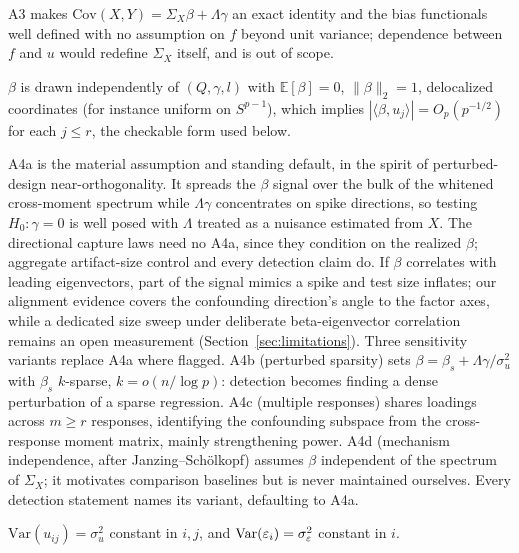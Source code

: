 A3 makes $\mathrm{Cov}(X,Y) = \Sigma_X\beta + \Lambda\gamma$ an exact identity and the bias functionals well defined with no assumption on $f$ beyond unit variance; dependence between $f$ and $u$ would redefine $\Sigma_X$ itself, and is out of scope.

\begin{assumption}
\label{assump:A4a}
$\beta$ is drawn independently of $(Q, \gamma, l)$ with $\mathbb{E}[\beta] = 0$, $\|\beta\|_2 = 1$, delocalized coordinates (for instance uniform on $S^{p-1}$), which implies $|\langle \beta, u_j \rangle| = O_p(p^{-1/2})$ for each $j \le r$, the checkable form used below.
\end{assumption}

A4a is the material assumption and standing default, in the spirit of perturbed-design near-orthogonality. It spreads the $\beta$ signal over the bulk of the whitened cross-moment spectrum while $\Lambda\gamma$ concentrates on spike directions, so testing $H_0\colon \gamma = 0$ is well posed with $\Lambda$ treated as a nuisance estimated from $X$. The directional capture laws need no A4a, since they condition on the realized $\beta$; aggregate artifact-size control and every detection claim do. If $\beta$ correlates with leading eigenvectors, part of the signal mimics a spike and test size inflates; our alignment evidence covers the confounding direction's angle to the factor axes, while a dedicated size sweep under deliberate beta-eigenvector correlation remains an open measurement (Section~\ref{sec:limitations}). Three sensitivity variants replace A4a where flagged. A4b (perturbed sparsity) sets $\beta = \beta_s + \Lambda\gamma/\sigma_u^2$ with $\beta_s$ $k$-sparse, $k = o(n/\log p)$: detection becomes finding a dense perturbation of a sparse regression. A4c (multiple responses) shares loadings across $m \ge r$ responses, identifying the confounding subspace from the cross-response moment matrix, mainly strengthening power. A4d (mechanism independence, after Janzing--Sch{\"o}lkopf) assumes $\beta$ independent of the spectrum of $\Sigma_X$; it motivates comparison baselines but is never maintained ourselves. Every detection statement names its variant, defaulting to A4a.

\begin{assumption}
\label{assump:A5}
$\mathrm{Var}(u_{ij}) = \sigma_u^2$ constant in $i, j$, and $\mathrm{Var}(\varepsilon_i) = \sigma_\varepsilon^2$ constant in $i$.
\end{assumption}

